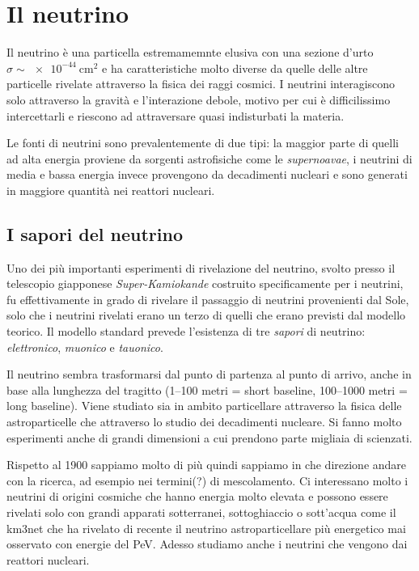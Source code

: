    \section{Il neutrino}
        Il neutrino è una particella estremamemnte elusiva con una sezione d'urto $\sigma \sim \SI{e-44}{\centi\meter\squared}$ e ha caratteristiche molto diverse da quelle delle altre particelle rivelate attraverso la fisica dei raggi cosmici. I neutrini interagiscono solo attraverso la gravità e l'interazione debole, motivo per cui è difficilissimo intercettarli e riescono ad attraversare quasi indisturbati la materia.

        Le fonti di neutrini sono prevalentemente di due tipi: la maggior parte di quelli ad alta energia proviene da sorgenti astrofisiche come le \textit{supernoavae}, i neutrini di media e bassa energia invece provengono da decadimenti nucleari e sono generati in maggiore quantità nei reattori nucleari.
        \subsection{I sapori del neutrino}
            Uno dei più importanti esperimenti di rivelazione del neutrino, svolto presso il telescopio giapponese \emph{Super-Kamiokande} costruito specificamente per i neutrini, fu effettivamente in grado di rivelare il passaggio di neutrini provenienti dal Sole, solo che i neutrini rivelati erano un terzo di quelli che erano previsti dal modello teorico.
            Il modello standard prevede l'esistenza di tre \emph{sapori} di neutrino: \emph{elettronico}, \emph{muonico} e \emph{tauonico}.

            Il neutrino sembra trasformarsi dal punto di partenza al punto di arrivo, anche in base alla lunghezza del tragitto (1--100 metri = short baseline, 100--1000 metri = long baseline). Viene studiato sia in ambito particellare attraverso la fisica delle astroparticelle che attraverso lo studio dei decadimenti nucleare. Si fanno molto esperimenti anche di grandi dimensioni a cui prendono parte migliaia di scienzati.

        Rispetto al 1900 sappiamo molto di più quindi sappiamo in che direzione andare con la ricerca, ad esempio nei termini(?) di mescolamento. Ci interessano molto i neutrini di origini cosmiche che hanno energia molto elevata e possono essere rivelati solo con grandi apparati sotterranei, sottoghiaccio o sott'acqua come il km3net che ha rivelato di recente il neutrino astroparticellare più energetico mai osservato con energie del PeV. Adesso studiamo anche i neutrini che vengono dai reattori nucleari.
        
